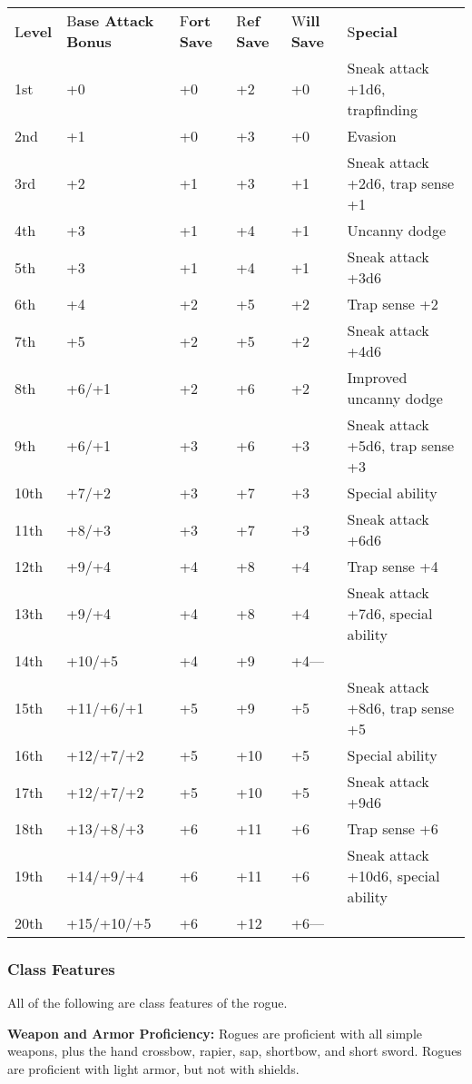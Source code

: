 \documentclass{article}
\begin{document}
\vspace{12pt}
\begin{tabular}{|>{\raggedright}p{25pt}|>{\raggedright}p{49pt}|>{\raggedright}p{23pt}|>{\raggedright}p{22pt}|>{\raggedright}p{23pt}|>{\raggedright}p{133pt}|}
\hline
\multicolumn{6}{|p{278pt}|}{T\textbf{able: The Rogue}}\tabularnewline
\hline
L\textbf{evel} & B\textbf{ase Attack Bonus} & F\textbf{ort }\linebreak{}
\textbf{Save} & R\textbf{ef }\linebreak{}
\textbf{Save} & W\textbf{ill }\linebreak{}
\textbf{Save} & S\textbf{pecial}\tabularnewline
\hline
1st & +0 & +0 & +2 & +0 & Sneak attack +1d6, trapfinding\tabularnewline
\hline
2nd & +1 & +0 & +3 & +0 & Evasion\tabularnewline
\hline
3rd & +2 & +1 & +3 & +1 & Sneak attack +2d6, trap sense +1\tabularnewline
\hline
4th & +3 & +1 & +4 & +1 & Uncanny dodge\tabularnewline
\hline
5th & +3 & +1 & +4 & +1 & Sneak attack +3d6\tabularnewline
\hline
6th & +4 & +2 & +5 & +2 & Trap sense +2\tabularnewline
\hline
7th & +5 & +2 & +5 & +2 & Sneak attack +4d6\tabularnewline
\hline
8th & +6/+1 & +2 & +6 & +2 & Improved uncanny dodge\tabularnewline
\hline
9th & +6/+1 & +3 & +6 & +3 & Sneak attack +5d6, trap sense +3\tabularnewline
\hline
10th & +7/+2 & +3 & +7 & +3 & Special ability\tabularnewline
\hline
11th & +8/+3 & +3 & +7 & +3 & Sneak attack +6d6\tabularnewline
\hline
12th & +9/+4 & +4 & +8 & +4 & Trap sense +4\tabularnewline
\hline
13th & +9/+4 & +4 & +8 & +4 & Sneak attack +7d6, special ability\tabularnewline
\hline
14th & +10/+5 & +4 & +9 & +4--- & \tabularnewline
\hline
15th & +11/+6/+1 & +5 & +9 & +5 & Sneak attack +8d6, trap sense +5\tabularnewline
\hline
16th & +12/+7/+2 & +5 & +10 & +5 & Special ability\tabularnewline
\hline
17th & +12/+7/+2 & +5 & +10 & +5 & Sneak attack +9d6\tabularnewline
\hline
18th & +13/+8/+3 & +6 & +11 & +6 & Trap sense +6\tabularnewline
\hline
19th & +14/+9/+4 & +6 & +11 & +6 & Sneak attack +10d6, special ability\tabularnewline
\hline
20th & +15/+10/+5 & +6 & +12 & +6--- & \tabularnewline
\hline
\end{tabular}

\vspace{12pt}
\subsubsection*{\textbf{Class Features}}

All of the following are class features of the rogue.

\textbf{Weapon and Armor Proficiency: }Rogues are proficient with all simple weapons, 
plus the hand crossbow, rapier, sap, shortbow, and short sword. Rogues are proficient 
with light armor, but not with shields.
\end{document}
